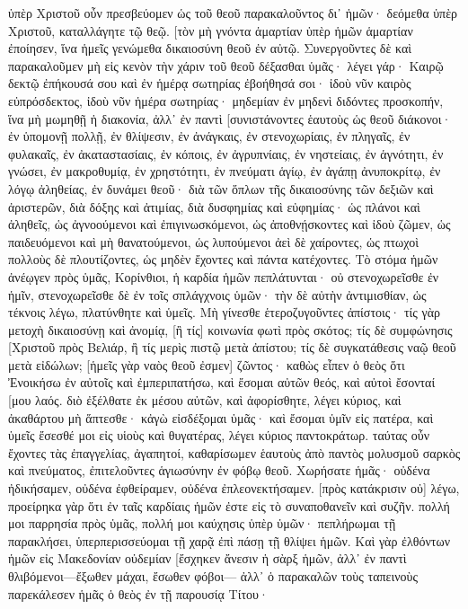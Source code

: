 ὑπὲρ Χριστοῦ οὖν πρεσβεύομεν ὡς τοῦ θεοῦ παρακαλοῦντος δι᾽ ἡμῶν· δεόμεθα ὑπὲρ Χριστοῦ, καταλλάγητε τῷ θεῷ. 
[τὸν μὴ γνόντα ἁμαρτίαν ὑπὲρ ἡμῶν ἁμαρτίαν ἐποίησεν, ἵνα ἡμεῖς γενώμεθα δικαιοσύνη θεοῦ ἐν αὐτῷ. 
Συνεργοῦντες δὲ καὶ παρακαλοῦμεν μὴ εἰς κενὸν τὴν χάριν τοῦ θεοῦ δέξασθαι ὑμᾶς· 
λέγει γάρ· Καιρῷ δεκτῷ ἐπήκουσά σου καὶ ἐν ἡμέρᾳ σωτηρίας ἐβοήθησά σοι· ἰδοὺ νῦν καιρὸς εὐπρόσδεκτος, ἰδοὺ νῦν ἡμέρα σωτηρίας· 
μηδεμίαν ἐν μηδενὶ διδόντες προσκοπήν, ἵνα μὴ μωμηθῇ ἡ διακονία, 
ἀλλ᾽ ἐν παντὶ [συνιστάνοντες ἑαυτοὺς ὡς θεοῦ διάκονοι· ἐν ὑπομονῇ πολλῇ, ἐν θλίψεσιν, ἐν ἀνάγκαις, ἐν στενοχωρίαις, 
ἐν πληγαῖς, ἐν φυλακαῖς, ἐν ἀκαταστασίαις, ἐν κόποις, ἐν ἀγρυπνίαις, ἐν νηστείαις, 
ἐν ἁγνότητι, ἐν γνώσει, ἐν μακροθυμίᾳ, ἐν χρηστότητι, ἐν πνεύματι ἁγίῳ, ἐν ἀγάπῃ ἀνυποκρίτῳ, 
ἐν λόγῳ ἀληθείας, ἐν δυνάμει θεοῦ· διὰ τῶν ὅπλων τῆς δικαιοσύνης τῶν δεξιῶν καὶ ἀριστερῶν, 
διὰ δόξης καὶ ἀτιμίας, διὰ δυσφημίας καὶ εὐφημίας· ὡς πλάνοι καὶ ἀληθεῖς, 
ὡς ἀγνοούμενοι καὶ ἐπιγινωσκόμενοι, ὡς ἀποθνῄσκοντες καὶ ἰδοὺ ζῶμεν, ὡς παιδευόμενοι καὶ μὴ θανατούμενοι, 
ὡς λυπούμενοι ἀεὶ δὲ χαίροντες, ὡς πτωχοὶ πολλοὺς δὲ πλουτίζοντες, ὡς μηδὲν ἔχοντες καὶ πάντα κατέχοντες. 
Τὸ στόμα ἡμῶν ἀνέῳγεν πρὸς ὑμᾶς, Κορίνθιοι, ἡ καρδία ἡμῶν πεπλάτυνται· 
οὐ στενοχωρεῖσθε ἐν ἡμῖν, στενοχωρεῖσθε δὲ ἐν τοῖς σπλάγχνοις ὑμῶν· 
τὴν δὲ αὐτὴν ἀντιμισθίαν, ὡς τέκνοις λέγω, πλατύνθητε καὶ ὑμεῖς. 
Μὴ γίνεσθε ἑτεροζυγοῦντες ἀπίστοις· τίς γὰρ μετοχὴ δικαιοσύνῃ καὶ ἀνομίᾳ, [ἢ τίς] κοινωνία φωτὶ πρὸς σκότος; 
τίς δὲ συμφώνησις [Χριστοῦ πρὸς Βελιάρ, ἢ τίς μερὶς πιστῷ μετὰ ἀπίστου; 
τίς δὲ συγκατάθεσις ναῷ θεοῦ μετὰ εἰδώλων; [ἡμεῖς γὰρ ναὸς θεοῦ ἐσμεν] ζῶντος· καθὼς εἶπεν ὁ θεὸς ὅτι Ἐνοικήσω ἐν αὐτοῖς καὶ ἐμπεριπατήσω, καὶ ἔσομαι αὐτῶν θεός, καὶ αὐτοὶ ἔσονταί [μου λαός. 
διὸ ἐξέλθατε ἐκ μέσου αὐτῶν, καὶ ἀφορίσθητε, λέγει κύριος, καὶ ἀκαθάρτου μὴ ἅπτεσθε· κἀγὼ εἰσδέξομαι ὑμᾶς· 
καὶ ἔσομαι ὑμῖν εἰς πατέρα, καὶ ὑμεῖς ἔσεσθέ μοι εἰς υἱοὺς καὶ θυγατέρας, λέγει κύριος παντοκράτωρ. 
ταύτας οὖν ἔχοντες τὰς ἐπαγγελίας, ἀγαπητοί, καθαρίσωμεν ἑαυτοὺς ἀπὸ παντὸς μολυσμοῦ σαρκὸς καὶ πνεύματος, ἐπιτελοῦντες ἁγιωσύνην ἐν φόβῳ θεοῦ. 
Χωρήσατε ἡμᾶς· οὐδένα ἠδικήσαμεν, οὐδένα ἐφθείραμεν, οὐδένα ἐπλεονεκτήσαμεν. 
[πρὸς κατάκρισιν οὐ] λέγω, προείρηκα γὰρ ὅτι ἐν ταῖς καρδίαις ἡμῶν ἐστε εἰς τὸ συναποθανεῖν καὶ συζῆν. 
πολλή μοι παρρησία πρὸς ὑμᾶς, πολλή μοι καύχησις ὑπὲρ ὑμῶν· πεπλήρωμαι τῇ παρακλήσει, ὑπερπερισσεύομαι τῇ χαρᾷ ἐπὶ πάσῃ τῇ θλίψει ἡμῶν. 
Καὶ γὰρ ἐλθόντων ἡμῶν εἰς Μακεδονίαν οὐδεμίαν [ἔσχηκεν ἄνεσιν ἡ σὰρξ ἡμῶν, ἀλλ᾽ ἐν παντὶ θλιβόμενοι—ἔξωθεν μάχαι, ἔσωθεν φόβοι— 
ἀλλ᾽ ὁ παρακαλῶν τοὺς ταπεινοὺς παρεκάλεσεν ἡμᾶς ὁ θεὸς ἐν τῇ παρουσίᾳ Τίτου· 
